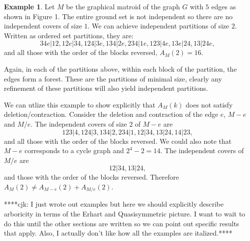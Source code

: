 \documentclass[12pt,reqno]{amsart}
\numberwithin{definition}{section}
\theoremstyle{definition}
\newtheorem{example}[definition]{Example}
\begin{document}
\begin{example}
Let $M$ be the graphical matroid of the graph $G$ with $5$ edges as
shown in Figure 1.  The entire ground set is not independent so there
are no independent covers of size $1$.  We can achieve independent
partitions of size $2$.  Written as ordered set partitions, they are:
$$ 34e|12, 12e|34, 124|3e, 134|2e, 234|1e, 123|4e, 13e|24, 13|24e, $$
and all those with the order of the blocks reversed, $A_M(2) = 16$.  

Again, in each of the partitions above, within each block of the
partition, the edges form a forest.  These are the partitions of
minimal size, clearly any refinement of these partitions will also
yield independent partitions.

\end{example}

We can utlize this example to show explicitly that $A_M(k)$ does not
satisfy deletion/contraction.  Consider the deletion and contraction
of the edge $e$, $M-e$ and $M/e$.  The independent covers of size $2$
of $M-e$ are
$$ 123|4, 124|3, 134|2, 234|1, 12|34, 13|24, 14|23, $$ and all those
with the order of the blocks reversed.  We could also note that $M-e$
corresponds to a cycle graph and $2^4 - 2 = 14$.  The independent
covers of $M/e$ are $$12|34, 13|24,$$ and those with the order of the
blocks reversed.  Therefore $A_M(2) \neq A_{M-e}(2) + A_{M/e}(2)$.







****cjk: I just wrote out examples but here we should explicitly describe arboricity in terms of the Erhart and Quasisymmetric picture.  I want to wait to do this until the other sections are written so we can point out specific results that apply.  Also, I actually don't like how all the examples are italized.****
\end{document}

